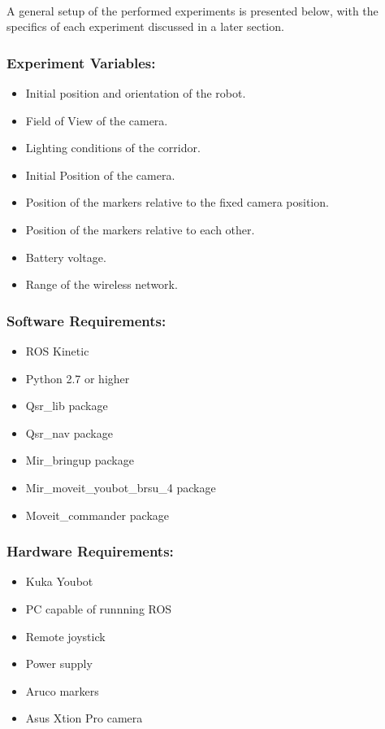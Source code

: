 \paragraph{} A general setup of the performed experiments is presented below, with the specifics of each experiment discussed in a later section.

\subsubsection*{Experiment Variables:}
\begin{itemize}
	\item Initial position and orientation of the robot.
	\item Field of View of the camera.
	\item Lighting conditions of the corridor.
	\item Initial Position of the camera.
	\item Position of the markers relative to the fixed camera position.
	\item Position of the markers relative to each other.
	\item Battery voltage.
	\item Range of the wireless network.
\end{itemize}

\subsubsection*{Software Requirements:}
\begin{itemize}
\item ROS Kinetic
\item Python 2.7 or higher
\item Qsr\_lib package
\item Qsr\_nav package
\item Mir\_bringup package 
\item Mir\_moveit\_youbot\_brsu\_4 package 
\item Moveit\_commander package 
\end{itemize}

\subsubsection*{Hardware Requirements:}
\begin{itemize}
	\item Kuka Youbot
	\item PC capable of runnning ROS
	\item Remote joystick 
	\item Power supply 
	\item Aruco markers
	\item Asus Xtion Pro camera
\end{itemize}

